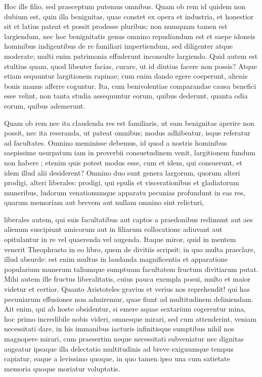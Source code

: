  Hoc ille filio, sed praeceptum putemus omnibus. Quam ob rem id quidem non dubium est, quin illa benignitas, quae constet ex opera et industria, et honestior sit et latius pateat et possit prodesse pluribus; non numquam tamen est largiendum, nec hoc benignitatis genus omnino repudiandum est et saepe idoneis hominibus indigentibus de re familiari impertiendum, sed diligenter atque moderate; multi enim patrimonia effuderunt inconsulte largiendo. Quid autem est stultius quam, quod libenter facias, curare, ut id diutius facere non possis? Atque etiam sequuntur largitionem rapinae; cum enim dando egere coeperunt, alienis bonis manus afferre coguntur. Ita, cum benivolentiae comparandae causa benefici esse velint, non tanta studia assequuntur eorum, quibus dederunt, quanta odia eorum, quibus ademerunt.

 Quam ob rem nec ita claudenda res est familiaris, ut eam benignitas aperire non possit, nec ita reseranda, ut pateat omnibus; modus adhibeatur, isque referatur ad facultates. Omnino meminisse debemus, id quod a nostris hominibus saepissime usurpatum iam in proverbii consuetudinem venit, largitionem fundum non habere ; etenim quis potest modus esse, cum et idem, qui consuerunt, et idem illud alii desiderent? Omnino duo sunt genera largorum, quorum alteri prodigi, alteri liberales: prodigi, qui epulis et viscerationibus et gladiatorum muneribus, ludorum venationumque apparatu pecunias profundunt in eas res, quarum memoriam aut brevem aut nullam omnino sint relicturi,

 liberales autem, qui suis facultatibus aut captos a praedonibus redimunt aut aes alienum suscipiunt amicorum aut in filiarum collocatione adiuvant aut opitulantur in re vel quaerenda vel augenda. Itaque miror, quid in mentem venerit Theophrasto in eo libro, quem de divitiis scripsit; in quo multa praeclare, illud absurde: est enim multus in laudanda magnificentia et apparatione popularium munerum taliumque sumptuum facultatem fructum divitiarum putat. Mihi autem ille fructus liberalitatis, cuius pauca exempla posui, multo et maior videtur et certior. Quanto Aristoteles gravius et verius nos reprehendit! qui has pecuniarum effusiones non admiremur, quae fiunt ad multitudinem deliniendam. Ait enim, qui ab hoste obsidentur, si emere aquae sextarium cogerentur mina, hoc primo incredibile nobis videri, omnesque mirari, sed cum attenderint, veniam necessitati dare, in his immanibus iacturis infinitisque sumptibus nihil nos magnopere mirari, cum praesertim neque necessitati subveniatur nec dignitas augeatur ipsaque illa delectatio multitudinis ad breve exiguumque tempus capiatur, eaque a levissimo quoque, in quo tamen ipso una cum satietate memoria quoque moriatur voluptatis.

